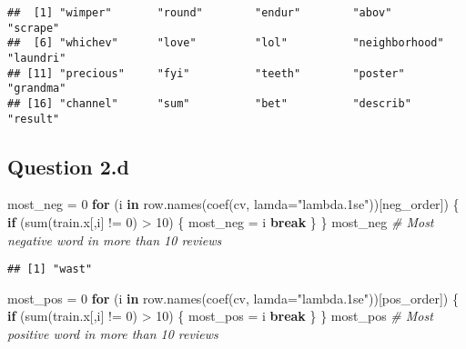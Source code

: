 \documentclass[
]{article}
\newenvironment{Shaded}{\begin{snugshade}}{\end{snugshade}}
\newcommand{\AttributeTok}[1]{\textcolor[rgb]{0.77,0.63,0.00}{#1}}
\newcommand{\CommentTok}[1]{\textcolor[rgb]{0.56,0.35,0.01}{\textit{#1}}}
\newcommand{\ControlFlowTok}[1]{\textcolor[rgb]{0.13,0.29,0.53}{\textbf{#1}}}
\newcommand{\DecValTok}[1]{\textcolor[rgb]{0.00,0.00,0.81}{#1}}
\newcommand{\FunctionTok}[1]{\textcolor[rgb]{0.00,0.00,0.00}{#1}}
\newcommand{\NormalTok}[1]{#1}
\newcommand{\OtherTok}[1]{\textcolor[rgb]{0.56,0.35,0.01}{#1}}
\newcommand{\SpecialCharTok}[1]{\textcolor[rgb]{0.00,0.00,0.00}{#1}}
\newcommand{\StringTok}[1]{\textcolor[rgb]{0.31,0.60,0.02}{#1}}
\begin{document}
\begin{verbatim}
##  [1] "wimper"       "round"        "endur"        "abov"         "scrape"      
##  [6] "whichev"      "love"         "lol"          "neighborhood" "laundri"     
## [11] "precious"     "fyi"          "teeth"        "poster"       "grandma"     
## [16] "channel"      "sum"          "bet"          "describ"      "result"
\end{verbatim}

\hypertarget{question-2.d}{%
\subsection{Question 2.d}\label{question-2.d}}

\begin{Shaded}
\begin{Highlighting}[]
\NormalTok{most\_neg }\OtherTok{=} \DecValTok{0}
\ControlFlowTok{for}\NormalTok{ (i }\ControlFlowTok{in} \FunctionTok{row.names}\NormalTok{(}\FunctionTok{coef}\NormalTok{(cv, }\AttributeTok{lamda=}\StringTok{"lambda.1se"}\NormalTok{))[neg\_order]) \{}
  \ControlFlowTok{if}\NormalTok{ (}\FunctionTok{sum}\NormalTok{(train.x[,i] }\SpecialCharTok{!=} \DecValTok{0}\NormalTok{) }\SpecialCharTok{\textgreater{}} \DecValTok{10}\NormalTok{) \{}
\NormalTok{    most\_neg }\OtherTok{=}\NormalTok{ i}
    \ControlFlowTok{break}
\NormalTok{  \}}
\NormalTok{\}}
\NormalTok{most\_neg }\CommentTok{\# Most negative word in more than 10 reviews}
\end{Highlighting}
\end{Shaded}

\begin{verbatim}
## [1] "wast"
\end{verbatim}

\begin{Shaded}
\begin{Highlighting}[]
\NormalTok{most\_pos }\OtherTok{=} \DecValTok{0}
\ControlFlowTok{for}\NormalTok{ (i }\ControlFlowTok{in} \FunctionTok{row.names}\NormalTok{(}\FunctionTok{coef}\NormalTok{(cv, }\AttributeTok{lamda=}\StringTok{"lambda.1se"}\NormalTok{))[pos\_order]) \{}
  \ControlFlowTok{if}\NormalTok{ (}\FunctionTok{sum}\NormalTok{(train.x[,i] }\SpecialCharTok{!=} \DecValTok{0}\NormalTok{) }\SpecialCharTok{\textgreater{}} \DecValTok{10}\NormalTok{) \{}
\NormalTok{    most\_pos }\OtherTok{=}\NormalTok{ i}
    \ControlFlowTok{break}
\NormalTok{  \}}
\NormalTok{\}}
\NormalTok{most\_pos }\CommentTok{\# Most positive word in more than 10 reviews}
\end{Highlighting}
\end{Shaded}
\end{document}

